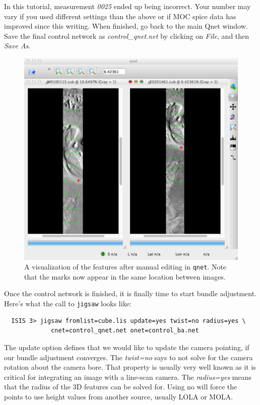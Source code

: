 In this tutorial, measurement \textit{0025} ended up being
incorrect. Your number may vary if you used different settings than
the above or if MOC spice data has improved since this writing. When
finished, go back to the main Qnet window. Save the final control
network as \textit{control\_qnet.net} by clicking on \textit{File},
and then \textit{Save As}.

\begin{figure}[ht]
  \centering
  \includegraphics[width=5in]{images/qnet/Qnet_AfterQnetManual_400px.png}
  \caption{A visualization of the features after manual editing in
    \texttt{qnet}. Note that the marks now appear in the same location
    between images.}
  \label{fig:after_manual}
\end{figure}

Once the control network is finished, it is finally time to start
bundle adjustment. Here's what the call to \texttt{jigsaw} looks like:

\begin{verbatim}
  ISIS 3> jigsaw fromlist=cube.lis update=yes twist=no radius=yes \
             cnet=control_qnet.net onet=control_ba.net
\end{verbatim}

The update option defines that we would like to update the camera
pointing, if our bundle adjustment converges. The \textit{twist=no}
says to not solve for the camera rotation about the camera bore. That
property is usually very well known as it is critical for integrating
an image with a line-scan camera. The \textit{radius=yes} means that
the radius of the 3D features can be solved for. Using no will force
the points to use height values from another source, usually LOLA or
MOLA.

